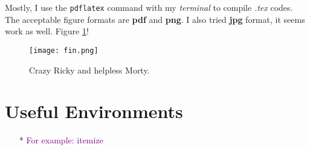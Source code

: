 \documentclass[12pt, letterpaper]{article} %
\begin{document}
Mostly, I use the  {\tt pdflatex} command with my \textit{terminal} to compile \textit{.tex} codes. The acceptable figure 
formats are \textbf{pdf} and \textbf{png}. I also tried \textbf{jpg} format, it seems work as well. 
Figure \ref{fig:rick}! %
\begin{figure}[!t] %
\begin{center} %
  \texttt{[image: fin.png]} %
  \caption{Crazy Ricky and helpless Morty.} %
  \label{fig:rick} %
\end{center} %
\end{figure} %





\section{Useful Environments} %
\begin{itemize} %
\item[*] \textcolor{purple}{For example: itemize} %
\end{itemize}  %

\begin{abstract}  %
\begin{quote} %
The \LaTeX  $ $ environment is a template with functions, as long as the data is entered in the prescribed format, the 
system will automatically complete the form.
\end{quote} %
\end{abstract} %
\end{document}
